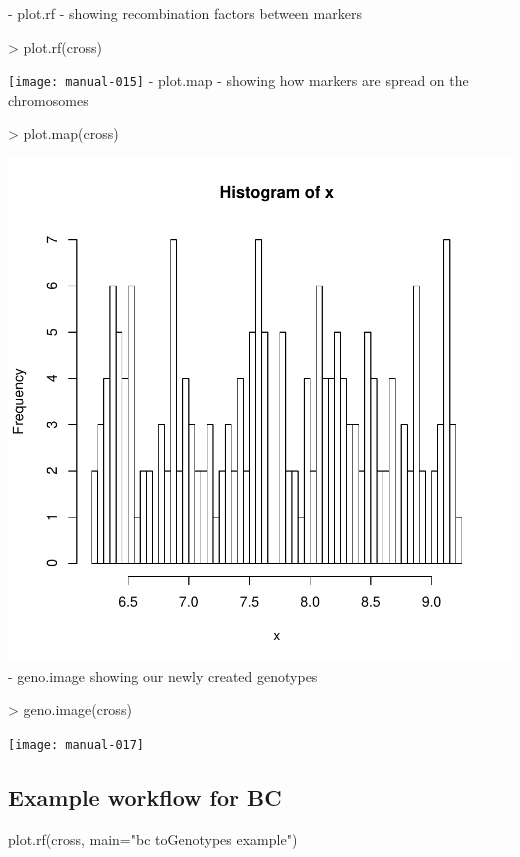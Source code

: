 \documentclass{article}
\begin{document}
{\noindent}- plot.rf - showing recombination factors between markers
\begin{Schunk}
\begin{Sinput}
> plot.rf(cross)
\end{Sinput}
\end{Schunk}
\texttt{[image: manual-015]}
\newpage
{\noindent}- plot.map - showing how markers are spread on the chromosomes
\begin{Schunk}
\begin{Sinput}
> plot.map(cross)
\end{Sinput}
\end{Schunk}
\includegraphics{manual-016}
\newpage
{\noindent}- geno.image showing our newly created genotypes
\begin{Schunk}
\begin{Sinput}
> geno.image(cross)
\end{Sinput}
\end{Schunk}
\texttt{[image: manual-017]}
\newpage
\subsection{Example workflow for BC}


	
	plot.rf(cross, main="bc toGenotypes example")
\end{document}
